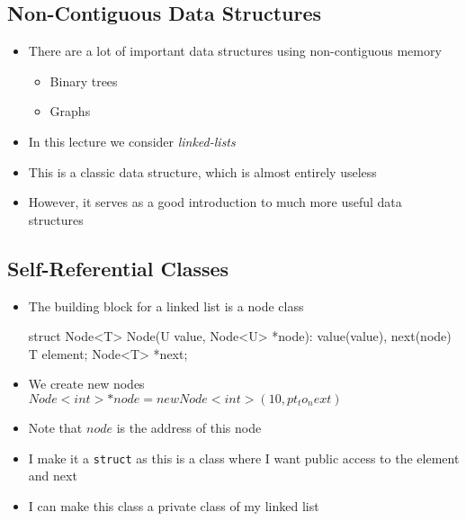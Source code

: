
\begin{slide}
\section{Non-Contiguous Data Structures}

\begin{PauseHighLight}
  \begin{itemize}
  \item There are a lot of important data structures using
    non-contiguous memory
    \begin{itemize}
    \item Binary trees
    \item Graphs\pause
    \end{itemize}
  \item In this lecture we consider \emph{linked-lists}\pause
  \item This is a classic data structure\pause, which is almost entirely
    useless\pauseb
  \item However, it serves as a good introduction to much more useful
    data structures\pause
  \end{itemize}
\end{PauseHighLight}

\end{slide}


%


\begin{slide}
\section[-2]{Self-Referential Classes}

\begin{PauseHighLight}
  \begin{itemize}
  \item The building block for a linked list is a node class
    \begin{java}
      struct Node<T>
      {
        Node(U value, Node<U> *node): value(value), next(node) {}
        T element;
        Node<T> *next;
      }      
    \end{java}\pause
    \vspace{-1cm}
  \item We create new nodes\\
    \jl$Node<int> *node = new Node<int>(10, pt_to_next)$\pause
  \item Note that \jl$node$ is the address of this node\pause
  \item I make it a \texttt{struct} as this is a class where I want
    public access to the element and next\pause
  \item I can make this class a private class of my linked list\pause 
  \end{itemize}
\end{PauseHighLight}
\end{slide}


